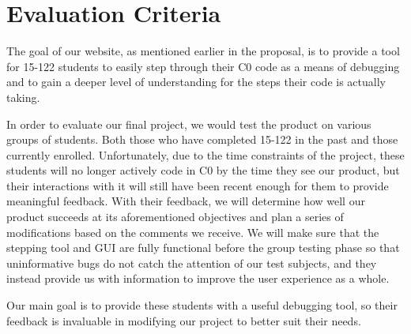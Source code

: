 \documentclass[11pt]{article}
\begin{document}
\section{Evaluation Criteria}
\par
The goal of our website, as mentioned earlier in the proposal, is to provide a
tool for 15-122 students to easily step through their C0 code as a means of
debugging and to gain a deeper level of understanding for the steps their code
is actually taking.
\par
In order to evaluate our final project, we would test the product on various
groups of students.  Both those who have completed 15-122 in the past and those
currently enrolled.  Unfortunately, due to the time constraints of the project,
these students will no longer actively code in C0 by the time they see our
product, but their interactions with it will still have been recent enough for
them to provide meaningful feedback.  With their feedback, we will determine
how well our product succeeds at its aforementioned objectives and plan a
series of modifications based on the comments we receive. We will make sure
that the stepping tool and GUI are fully functional before the group testing
phase so that uninformative bugs do not catch the attention of our test
subjects, and they instead provide us with information to improve the user
experience as a whole.
\par
Our main goal is to provide these students with a useful debugging tool, so
their feedback is invaluable in modifying our project to better suit
their needs.
\end{document}
